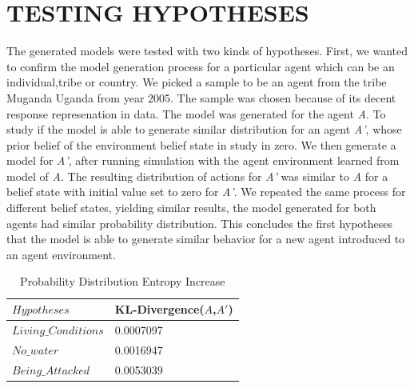 {\section{TESTING HYPOTHESES}

The generated models were tested with two kinds of hypotheses. First, we wanted to confirm the model generation process for a particular agent which can be an individual,tribe or country. We picked a sample to be an agent from the tribe Muganda Uganda from year 2005. The sample was chosen because of its decent response represenation in data. The model was generated for the agent \textit{A}. To study if the model is able to generate similar distribution for an agent \textit{A'}, whose prior belief of the environment belief state in study in zero. We then generate a model for \textit{A'}, after running simulation with the agent environment learned from model of \textit{A}. The resulting distribution of actions for \textit{A'} was similar to \textit{A} for a belief state with initial value set to zero for \textit{A'}. We repeated the same process for different belief states, yielding similar results, the model generated for both agents had similar probability distribution. This concludes the first hypotheses that the model is able to generate similar behavior for a new agent introduced to an agent environment.


\begin{table}[!th]
	
	\caption{Probability Distribution Entropy Increase }
	\begin{tabular}{|l|l|}
		\hline
	$ Hypotheses$	& KL-Divergence($A$,$A'$) \\
		
		\hline			
		$ Living\_Conditions$    &     0.0007097       \\ 
		
		       
		\hline
		$ No\_water$             &      0.0016947       \\ 
		
		    
		\hline
		$ Being\_Attacked $          &     0.0053039        \\ 
		
		    
		
		    
		\hline						
	\end{tabular}
	\label{tab:random}
\end{table}

}
